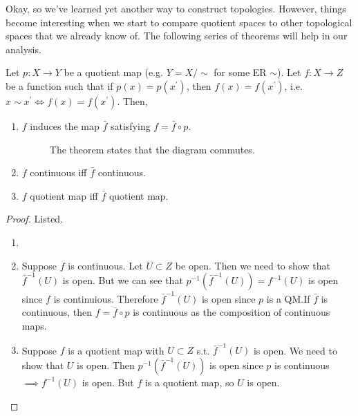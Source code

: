     Okay, so we've learned yet another way to construct topologies. However, things become interesting when we start to compare quotient spaces to other topological spaces that we already know of. The following series of theorems will help in our analysis. 

    \begin{theorem}
      Let $p: X \rightarrow Y$ be a quotient map (e.g. $Y = X/{\sim}$ for some ER $\sim$). Let $f: X \rightarrow Z$ be a function such that if $p(x) = p(x^\prime)$, then $f(x) = f(x^\prime)$, i.e. $x \sim x^\prime \iff f(x) = f(x^\prime)$. Then, 
      \begin{enumerate}
        \item $f$ induces the map $\bar{f}$ satisfying $f = \bar{f} \circ p$. 

        \begin{figure}[H]
          \centering 
          \caption{The theorem states that the diagram commutes. } 
          \label{fig:quotient_continuity}
        \end{figure}

        \item $f$ continuous iff $\bar{f}$ continuous. 
        \item $f$ quotient map iff $\bar{f}$ quotient map. 
      \end{enumerate}
    \end{theorem}
    \begin{proof}
      Listed. 
      \begin{enumerate}
        \item 
        \item Suppose $f$ is continuous. Let $U \subset Z$ be open. Then we need to show that $\bar{f}^{-1} (U)$ is open. But we can see that $p^{-1} (\bar{f}^{-1}(U)) = f^{-1} (U)$ is open since $f$ is continuious. Therefore $\bar{f}^{-1} (U)$ is open since $p$ is a QM.If $\bar{f}$ is continuous, then $f = \bar{f} \circ p$ is continuous as the composition of continuous maps. 
        \item Suppose $f$ is a quotient map with $U \subset Z$ s.t. $\bar{f}^{-1} (U)$ is open. We need to show that $U$ is open. Then $p^{-1} (\bar{f}^{-1} (U))$ is open since $p$ is continuous $\implies f^{-1} (U)$ is open. But $f$ is a quotient map, so $U$ is open. 
      \end{enumerate}
    \end{proof}

